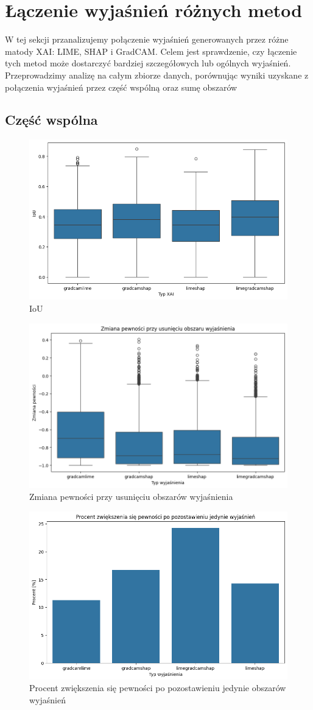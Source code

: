 \section*{Łączenie wyjaśnień różnych metod}
W tej sekcji przanalizujemy połączenie wyjaśnień generowanych przez różne matody XAI: LIME, SHAP i GradCAM.
Celem jest sprawdzenie, czy łączenie tych metod może dostarczyć bardziej szczegółowych lub ogólnych wyjaśnień.
Przeprowadzimy analizę na całym zbiorze danych, porównując wyniki uzyskane z połączenia wyjaśnień przez część wspólną oraz sumę obszarów

\subsection*{Część wspólna}
\begin{figure}
	\centering\includegraphics[width=.6\textwidth]{img/combine_iou_or}
	\caption{IoU}  \label{rys:combine_iou_or}
\end{figure}
\begin{figure}
	\centering\includegraphics[width=.6\textwidth]{img/combine_confidence_mask_or}
	\caption{Zmiana pewności przy usunięciu obszarów wyjaśnienia}  \label{rys:combine_confidence_mask_or}
\end{figure}
\begin{figure}
	\centering\includegraphics[width=.6\textwidth]{img/combine_confidence_womask_or}
	\caption{Procent zwiększenia się pewności po pozostawieniu jedynie obszarów wyjaśnień}  \label{rys:combine_confidence_womask_or}
\end{figure}

